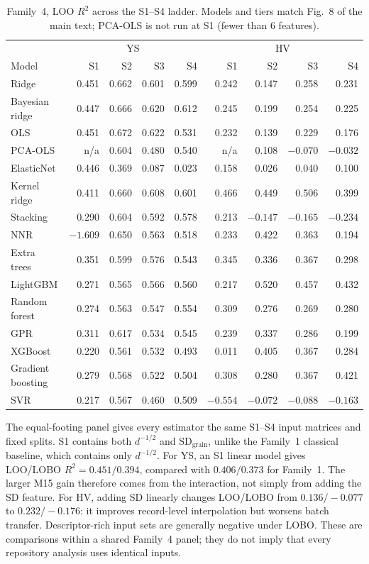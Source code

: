 \documentclass[a4paper,11pt]{article}
\begin{document}
\begin{table}[H]
\centering
\caption{Family~4, LOO $R^2$ across the S1--S4 ladder. Models and tiers match Fig.~8 of the main text; PCA-OLS is not run at S1 (fewer than 6 features).}
\label{tab:f4_loo}
\small
\begin{tabular}{@{}lrrrr|rrrr@{}}
\toprule
& \multicolumn{4}{c|}{YS} & \multicolumn{4}{c}{HV} \\
Model & S1 & S2 & S3 & S4 & S1 & S2 & S3 & S4 \\
\midrule
Ridge            & 0.451  & 0.662 & 0.601 & 0.599 & 0.242 & 0.147 & 0.258 & 0.231 \\
Bayesian ridge   & 0.447  & 0.666 & 0.620 & 0.612 & 0.245 & 0.199 & 0.254 & 0.225 \\
OLS              & 0.451  & 0.672 & 0.622 & 0.531 & 0.232 & 0.139 & 0.229 & 0.176 \\
PCA-OLS          & n/a    & 0.604 & 0.480 & 0.540 & n/a   & 0.108 & $-0.070$ & $-0.032$ \\
ElasticNet       & 0.446  & 0.369 & 0.087 & 0.023 & 0.158 & 0.026 & 0.040 & 0.100 \\
Kernel ridge     & 0.411  & 0.660 & 0.608 & 0.601 & 0.466 & 0.449 & 0.506 & 0.399 \\
Stacking         & 0.290  & 0.604 & 0.592 & 0.578 & 0.213 & $-0.147$ & $-0.165$ & $-0.234$ \\
NNR              & $-1.609$ & 0.650 & 0.563 & 0.518 & 0.233 & 0.422 & 0.363 & 0.194 \\
Extra trees      & 0.351  & 0.599 & 0.576 & 0.543 & 0.345 & 0.336 & 0.367 & 0.298 \\
LightGBM         & 0.271  & 0.565 & 0.566 & 0.560 & 0.217 & 0.520 & 0.457 & 0.432 \\
Random forest    & 0.274  & 0.563 & 0.547 & 0.554 & 0.309 & 0.276 & 0.269 & 0.280 \\
GPR              & 0.311  & 0.617 & 0.534 & 0.545 & 0.239 & 0.337 & 0.286 & 0.199 \\
XGBoost          & 0.220  & 0.561 & 0.532 & 0.493 & 0.011 & 0.405 & 0.367 & 0.284 \\
Gradient boosting& 0.279  & 0.568 & 0.522 & 0.504 & 0.308 & 0.280 & 0.367 & 0.421 \\
SVR              & 0.217  & 0.567 & 0.460 & 0.509 & $-0.554$ & $-0.072$ & $-0.088$ & $-0.163$ \\
\bottomrule
\end{tabular}
\end{table}

The equal-footing panel gives every estimator the same S1--S4 input matrices and fixed splits. S1 contains both $d^{-1/2}$ and $\mathrm{SD}_{\mathrm{grain}}$, unlike the Family~1 classical baseline, which contains only $d^{-1/2}$. For YS, an S1 linear model gives LOO/LOBO $R^2=0.451/0.394$, compared with $0.406/0.373$ for Family~1. The larger M15 gain therefore comes from the interaction, not simply from adding the SD feature. For HV, adding SD linearly changes LOO/LOBO from $0.136/-0.077$ to $0.232/-0.176$: it improves record-level interpolation but worsens batch transfer. Descriptor-rich input sets are generally negative under LOBO. These are comparisons within a shared Family~4 panel; they do not imply that every repository analysis uses identical inputs.
\end{document}
